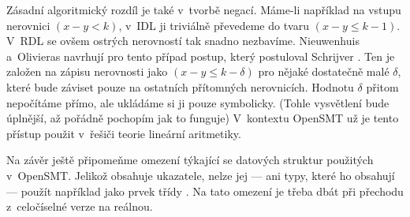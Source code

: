 Zásadní algoritmický rozdíl je také v~tvorbě negací. Máme-li například na vstupu nerovnici $(x-y<k)$, v~IDL ji triviálně převedeme do tvaru $(x-y\leq k-1)$. V~RDL se ovšem ostrých nerovností tak snadno nezbavíme. Nieuwenhuis a~Olivieras \cite{Nieuwenhuis05} navrhují pro tento případ postup, který postuloval Schrijver \cite{Schrijver86}. Ten je založen na zápisu nerovnosti jako $(x-y\leq k-\delta)$ pro nějaké dostatečně malé $\delta$, které bude záviset pouze na ostatních přítomných nerovnicích. Hodnotu $\delta$ přitom nepočítáme přímo, ale ukládáme si ji pouze symbolicky. (Tohle vysvětlení bude úplnější, až pořádně pochopím jak to funguje) %
V~kontextu OpenSMT už je tento přístup použit v~řešiči teorie lineární aritmetiky.

Na závěr ještě připomeňme omezení týkající se datových struktur použitých v~OpenSMT. Jelikož  obsahuje ukazatele, nelze jej --- ani typy, které ho obsahují --- použít například jako prvek třídy . Na tato omezení je třeba dbát při přechodu z~celočíselné verze na reálnou.

